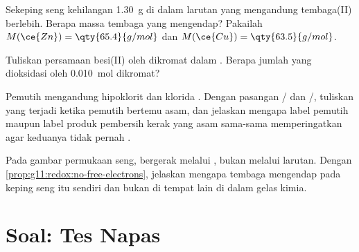 \begin{exercise}[$\star\star\star$]\label{exo:g11:redox:12}
Sekeping seng kehilangan \qty{1.30}{g} di dalam larutan yang mengandung
 tembaga(II) berlebih. Berapa massa tembaga yang mengendap? Pakailah
$M(\ce{Zn}) = \qty{65.4}{g/mol}$ dan $M(\ce{Cu}) = \qty{63.5}{g/mol}$.
\end{exercise}

\begin{exercise}[$\star\star\star$]\label{exo:g11:redox:13}
Tuliskan persamaan   besi(II) oleh  dikromat dalam . Berapa jumlah  yang dioksidasi oleh \qty{0.010}{mol}
 dikromat?
\end{exercise}

\begin{exercise}[$\star\star\star$]\label{exo:g11:redox:14}
Pemutih mengandung  hipoklorit  dan  klorida .
Dengan pasangan / dan /, tuliskan
 yang terjadi ketika pemutih bertemu asam, dan jelaskan
mengapa label pemutih maupun label produk pembersih kerak yang asam
sama-sama memperingatkan agar keduanya tidak pernah .
\end{exercise}

\begin{exercise}[$\star\star\star$]\label{exo:g11:redox:15}
Pada gambar permukaan seng,  bergerak melalui ,
bukan melalui larutan. Dengan \cref{prop:g11:redox:no-free-electrons},
jelaskan mengapa tembaga mengendap pada keping seng itu sendiri dan
bukan di tempat lain di dalam gelas kimia.
\end{exercise}

\section{Soal: Tes Napas}

